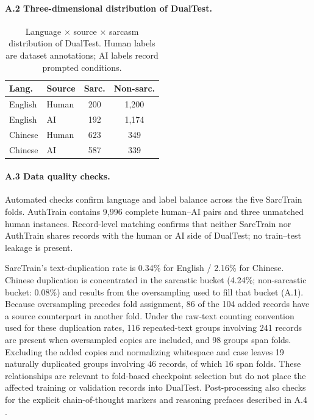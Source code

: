 \paragraph{A.2 Three-dimensional distribution of DualTest.}

\begin{table}[h]
  \centering
  \small
  \begin{tabular}{@{}llcc@{}}
    \toprule
    \textbf{Lang.} & \textbf{Source} & \textbf{Sarc.} & \textbf{Non-sarc.} \\
    \midrule
    English & Human & 200 & 1{,}200 \\
    English & AI & 192 & 1{,}174 \\
    Chinese & Human & 623 & 349 \\
    Chinese & AI & 587 & 339 \\
    \bottomrule
  \end{tabular}
  \caption{Language $\times$ source $\times$ sarcasm distribution of DualTest. Human labels are dataset annotations; AI labels record prompted conditions.}
  \label{tab:dualtest-dist}
\end{table}

\paragraph{A.3 Data quality checks.} Automated checks confirm language and label balance across the five SarcTrain folds. AuthTrain contains 9{,}996 complete human--AI pairs and three unmatched human instances. Record-level matching confirms that neither SarcTrain nor AuthTrain shares records with the human or AI side of DualTest; no train--test leakage is present.

SarcTrain's text-duplication rate is 0.34\% for English / 2.16\% for Chinese. Chinese duplication is concentrated in the sarcastic bucket (4.24\%; non-sarcastic bucket: 0.08\%) and results from the oversampling used to fill that bucket (A.1). Because oversampling precedes fold assignment, 86 of the 104 added records have a source counterpart in another fold. Under the raw-text counting convention used for these duplication rates, 116 repeated-text groups involving 241 records are present when oversampled copies are included, and 98 groups span folds. Excluding the added copies and normalizing whitespace and case leaves 19 naturally duplicated groups involving 46 records, of which 16 span folds. These relationships are relevant to fold-based checkpoint selection but do not place the affected training or validation records into DualTest. Post-processing also checks for the explicit chain-of-thought markers and reasoning prefaces described in A.4 \citep{wei2022cot}.

